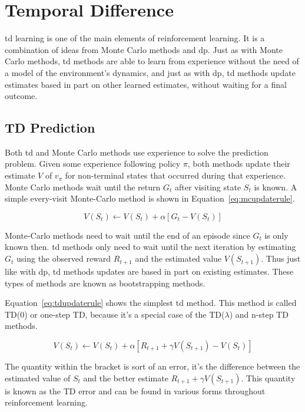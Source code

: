 \section{Temporal Difference}
\label{sec:temporal_difference}
\acrfull{td} learning is one of the main elements of reinforcement learning. It is a combination of ideas from Monte Carlo methods and \gls{dp}. Just as with Monte Carlo methods, \gls{td} methods are able to learn from experience without the need of a model of the environment's dynamics, and just as with \gls{dp}, \gls{td} methods update estimates based in part on other learned estimates, without waiting for a final outcome.

\subsection{TD Prediction}
Both \gls{td} and Monte Carlo methods use experience to solve the prediction problem. Given some experience following policy $\pi$, both methods update their estimate $V$ of $v_\pi$ for non-terminal states that occurred during that experience. Monte Carlo methods wait until the return $G_t$ after visiting state $S_t$ is known. A simple every-visit Monte-Carlo method is shown in Equation~\ref{eq:mcupdaterule}.


\begin{equation}
  \label{eq:mcupdaterule}
  V(S_t) \leftarrow V(S_t) + \alpha \left [  G_t - V(S_t) \right ]
\end{equation}

Monte-Carlo methods need to wait until the end of an episode since $G_t$ is only known then. \gls{td} methods only need to wait until the next iteration by estimating $G_t$ using the observed reward $R_{t+1}$ and the estimated value $V(S_{t+1})$. Thus just like with \gls{dp}, \gls{td} methods updates are based in part on existing estimates. These types of methods are known as bootstrapping methods.

Equation~\ref{eq:tdupdaterule} shows the simplest \gls{td} method. This method is called TD(0) or one-step TD, because it's a special case of the TD($\lambda$) and n-step TD methods. 

\begin{equation}
  \label{eq:tdupdaterule}
  V(S_t) \leftarrow V(S_t) + \alpha \left [  R_{t+1} + \gamma V(S_{t+1})- V(S_t) \right ]
\end{equation}

The quantity within the bracket is sort of an error, it's the difference between the estimated value of $S_t$ and the better estimate $R_{t+1} + \gamma V(S_{t+1})$. This quantity is known as the TD error and can be found in various forms throughout reinforcement learning.

